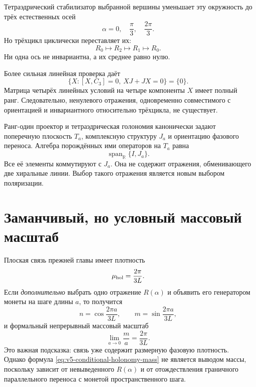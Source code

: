 Тетраэдрический стабилизатор выбранной вершины уменьшает эту окружность до
трёх естественных осей
\begin{equation}
 \alpha=0,\quad\frac\pi3,\quad\frac{2\pi}3.
\end{equation}
Но трёхцикл циклически переставляет их:
\begin{equation}
 R_0\longmapsto R_2\longmapsto R_1\longmapsto R_0.
\end{equation}
Ни одна ось не инвариантна, а их среднее равно нулю.

Более сильная линейная проверка даёт
\begin{equation}
 \{X:[X,C_3]=0,\ XJ+JX=0\}=\{0\}.
 \label{eq:v5-no-invariant-reflection}
\end{equation}
Матрица четырёх линейных условий на четыре компоненты $X$ имеет полный
ранг. Следовательно, ненулевого отражения, одновременно совместимого с
ориентацией и инвариантного относительно трёхцикла, не существует.

\begin{theorem}
Ранг-один проектор и тетраэдрическая голономия канонически задают
поперечную плоскость $T_a$, комплексную структуру $J_a$ и ориентацию
фазового переноса. Алгебра порождённых ими операторов на $T_a$ равна
\begin{equation}
 \operatorname{span}_{\mathbb R}\{I,J_a\}.
\end{equation}
Все её элементы коммутируют с $J_a$. Она не содержит отражения,
обменивающего две хиральные линии. Выбор такого отражения является новым
выбором поляризации.
\end{theorem}

\section{Заманчивый, но условный массовый масштаб}

Плоская связь прежней главы имеет плотность
\begin{equation}
 \mu_{\rm hol}=\frac{2\pi}{3L}.
\end{equation}
Если \emph{дополнительно} выбрать одно отражение $R(\alpha)$ и объявить
его генератором монеты на шаге длины $a$, то получится
\begin{equation}
 n=\cos\frac{2\pi a}{3L},
 \qquad
 m=\sin\frac{2\pi a}{3L},
\end{equation}
и формальный непрерывный массовый масштаб
\begin{equation}
 \lim_{a\to0}\frac{m}{a}=\frac{2\pi}{3L}.
 \label{eq:v5-conditional-holonomy-mass}
\end{equation}
Это важная подсказка: связь уже содержит размерную фазовую плотность.
Однако формула \eqref{eq:v5-conditional-holonomy-mass} не является выводом
массы, поскольку зависит от невыведенного $R(\alpha)$ и от отождествления
граничного параллельного переноса с монетой пространственного шага.

